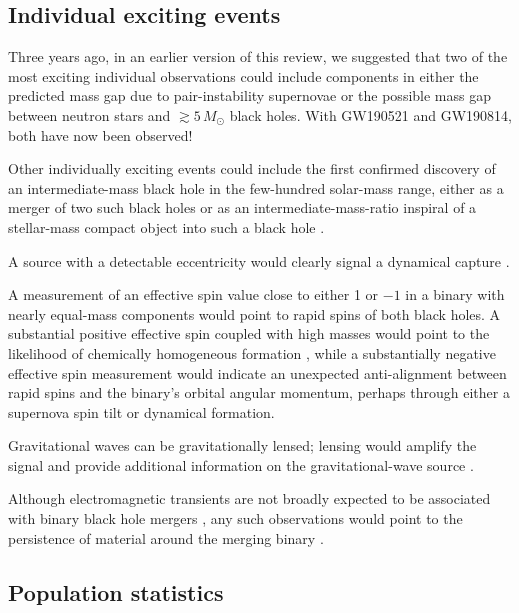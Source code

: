 \documentclass[review]{elsarticle}
\begin{document}
\subsection{Individual exciting events}
Three years ago, in an earlier version of this review, we suggested that two of the most exciting individual observations could include components in either the predicted mass gap due to pair-instability supernovae or the possible mass gap between neutron stars and $\gtrsim 5\, M_\odot$ black holes.  With GW190521 and GW190814, both have now been observed!

Other individually exciting events could include the first confirmed discovery of an intermediate-mass black hole in the few-hundred solar-mass range, either as a merger of two such black holes \citep[e.g.,][]{AmaroSeoaneSantamaria:2009,Veitch:2015,Graff:2015} or as an intermediate-mass-ratio inspiral of a stellar-mass compact object into such a black hole \citep[e.g.,][]{Mandel:2008,Haster:2015IMRI,Haster:2016}. 

A source with a detectable eccentricity would clearly signal a dynamical capture \citep[e.g.,][]{Zevin:2017,Rodriguez:2018}. 

A measurement of an effective spin value close to either 1 or $-1$ in a binary with nearly equal-mass components would point to rapid spins of both black holes. A substantial positive effective spin coupled with high masses would point to the likelihood of chemically homogeneous formation \citep{Marchant:2016}, while a substantially negative effective spin measurement would indicate an unexpected anti-alignment between rapid spins and the binary's orbital angular momentum, perhaps through either a supernova spin tilt or dynamical formation.  

Gravitational waves can be gravitationally lensed; lensing would amplify the signal and provide additional information on the gravitational-wave source \citep[e.g.,][]{Broadhurst:2019,Hannuksela:2019,Marchant:2020}.

Although electromagnetic transients are not broadly expected to be associated with binary black hole mergers \citep[e.g.,][]{Lyutikov:2016}, any such observations would point to the persistence of material around the merging binary \citep[e.g.,][]{deMinkKing:2017}.

\subsection{Population statistics}
\end{document}
